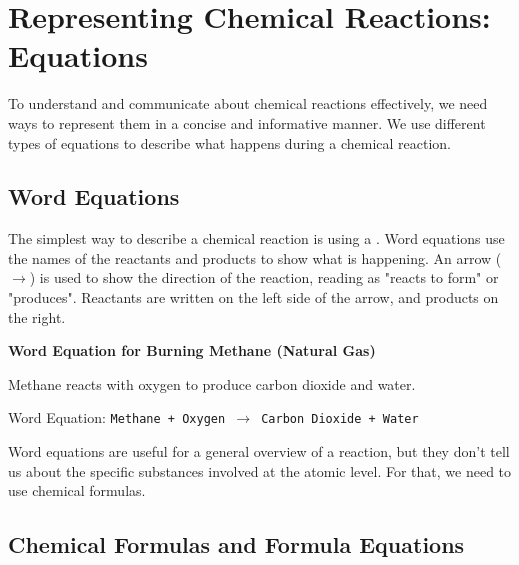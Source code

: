 \section{Representing Chemical Reactions: Equations}


To understand and communicate about chemical reactions effectively, we need ways to represent them in a concise and informative manner. We use different types of equations to describe what happens during a chemical reaction.

\subsection{Word Equations}


The simplest way to describe a chemical reaction is using a . Word equations use the names of the reactants and products to show what is happening.  An arrow ($\rightarrow$) is used to show the direction of the reaction, reading as "reacts to form" or "produces". Reactants are written on the left side of the arrow, and products on the right.

\begin{example}
\textbf{Word Equation for Burning Methane (Natural Gas)}

Methane reacts with oxygen to produce carbon dioxide and water.

Word Equation:
\texttt{Methane + Oxygen $\rightarrow$ Carbon Dioxide + Water}
\end{example}

Word equations are useful for a general overview of a reaction, but they don't tell us about the specific substances involved at the atomic level. For that, we need to use chemical formulas.

\subsection{Chemical Formulas and Formula Equations}


